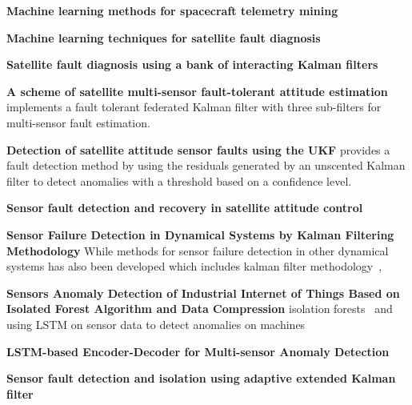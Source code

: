 \textbf{Machine learning methods for spacecraft telemetry mining}
\cite{ibrahim2018machine}

\textbf{Machine learning techniques for satellite fault diagnosis}
\cite{ibrahim2020machine}

\textbf{Satellite fault diagnosis using a bank of interacting Kalman filters}
\cite{Tudoroiu2007}

\textbf{A scheme of satellite multi-sensor fault-tolerant attitude estimation}
\cite{Zhou2016} implements a fault tolerant federated Kalman filter with three sub-filters for multi-sensor fault estimation. 

\textbf{Detection of satellite attitude sensor faults using the UKF}
\cite{Xiong2007} provides a fault detection method by using the residuals generated by an unscented Kalman filter to detect anomalies with a threshold based on a confidence level. 


\textbf{Sensor fault detection and recovery in satellite attitude control}
\cite{Nasrolahi2018} 

\textbf{Sensor Failure Detection in Dynamical Systems by Kalman Filtering Methodology}
While methods for sensor failure detection in other dynamical systems has also been developed which includes kalman filter methodology~\cite{Ciftciogl1991},

\textbf{Sensors Anomaly Detection of Industrial Internet of Things Based on Isolated Forest Algorithm and Data Compression}
isolation forests~\cite{Liu2021} and using LSTM on sensor data to detect anomalies on machines 

\textbf{LSTM-based Encoder-Decoder for Multi-sensor Anomaly Detection}
\cite{Malhotra2016}

\textbf{Sensor fault detection and isolation using adaptive extended Kalman filter}
\cite{van2012sensor}


